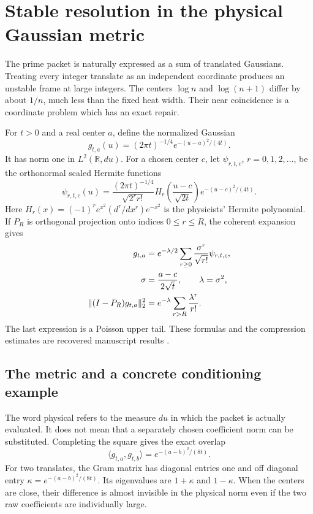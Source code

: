 \section{Stable resolution in the physical Gaussian metric}

The prime packet is naturally expressed as a sum of translated Gaussians. Treating every integer translate as an independent coordinate produces an unstable frame at large integers. The centers \(\log n\) and \(\log(n+1)\) differ by about \(1/n\), much less than the fixed heat width. Their near coincidence is a coordinate problem which has an exact repair.

For \(t>0\) and a real center \(a\), define the normalized Gaussian
\begin{equation}\label{rh:gaussian}
g_{t,a}(u)=(2\pi t)^{-1/4}e^{-(u-a)^2/(4t)}.
\end{equation}
It has norm one in \(L^2(\mathbb R,du)\). For a chosen center \(c\), let \(\psi_{r,t,c}\), \(r=0,1,2,\ldots\), be the orthonormal scaled Hermite functions
\begin{equation}\label{rh:hermite}
\psi_{r,t,c}(u)=
\frac{(2\pi t)^{-1/4}}{\sqrt{2^r r!}}
H_r\left(\frac{u-c}{\sqrt{2t}}\right)e^{-(u-c)^2/(4t)}.
\end{equation}
Here \(H_r(x)=(-1)^r e^{x^2}(d^r/dx^r)e^{-x^2}\) is the physicists' Hermite polynomial. If \(P_R\) is orthogonal projection onto indices \(0\le r\le R\), the coherent expansion gives
\begin{align}
g_{t,a}&=e^{-\lambda/2}
\sum_{r\ge0}\frac{\sigma^r}{\sqrt{r!}}\psi_{r,t,c},
\label{rh:coherent}\\
\sigma&=\frac{a-c}{2\sqrt t},\qquad \lambda=\sigma^2,
\notag\\
\|(I-P_R)g_{t,a}\|_2^2
&=e^{-\lambda}\sum_{r>R}\frac{\lambda^r}{r!}.
\label{rh:poisson}
\end{align}
The last expression is a Poisson upper tail. These formulas and the compression estimates are recovered manuscript results \cite{KomorebiHermite}.

\subsection{The metric and a concrete conditioning example}

The word physical refers to the measure \(du\) in which the packet is actually evaluated. It does not mean that a separately chosen coefficient norm can be substituted. Completing the square gives the exact overlap
\begin{equation}\label{rh:overlap}
\langle g_{t,a},g_{t,b}\rangle
=e^{-(a-b)^2/(8t)}.
\end{equation}
For two translates, the Gram matrix has diagonal entries one and off diagonal entry \(\kappa=e^{-(a-b)^2/(8t)}\). Its eigenvalues are \(1+\kappa\) and \(1-\kappa\). When the centers are close, their difference is almost invisible in the physical norm even if the two raw coefficients are individually large.

